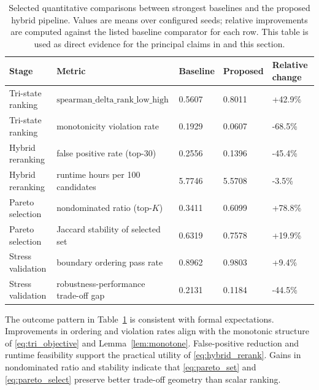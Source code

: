 \documentclass{article} %
\begin{document}
\begin{table}[t]
\caption{Selected quantitative comparisons between strongest baselines and the proposed hybrid pipeline. Values are means over configured seeds; relative improvements are computed against the listed baseline comparator for each row. This table is used as direct evidence for the principal claims in  and this section.}
\label{tab:main_results}
\centering
\small
\renewcommand{\arraystretch}{1.1}
\setlength{\tabcolsep}{4pt}
\begin{tabular}{lllll}
\hline
Stage & Metric & Baseline & Proposed & Relative change \\
\hline
Tri-state ranking & $\text{spearman\_delta\_rank\_low\_high}$ & 0.5607 & 0.8011 & +42.9\% \\
Tri-state ranking & monotonicity violation rate & 0.1929 & 0.0607 & -68.5\% \\
Hybrid reranking & false positive rate (top-30) & 0.2556 & 0.1396 & -45.4\% \\
Hybrid reranking & runtime hours per 100 candidates & 5.7746 & 5.5708 & -3.5\% \\
Pareto selection & nondominated ratio (top-$K$) & 0.3411 & 0.6099 & +78.8\% \\
Pareto selection & Jaccard stability of selected set & 0.6319 & 0.7578 & +19.9\% \\
Stress validation & boundary ordering pass rate & 0.8962 & 0.9803 & +9.4\% \\
Stress validation & robustness-performance trade-off gap & 0.2131 & 0.1184 & -44.5\% \\
\hline
\end{tabular}
\end{table}

The outcome pattern in Table~\ref{tab:main_results} is consistent with formal expectations. Improvements in ordering and violation rates align with the monotonic structure of \eqref{eq:tri_objective} and Lemma~\ref{lem:monotone}. False-positive reduction and runtime feasibility support the practical utility of \eqref{eq:hybrid_rerank}. Gains in nondominated ratio and stability indicate that \eqref{eq:pareto_set} and \eqref{eq:pareto_select} preserve better trade-off geometry than scalar ranking.
\end{document}
